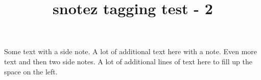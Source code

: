 \documentclass{article}
\title{snotez tagging test - 2}
\begin{document}
Some text with a side note.
A lot of additional text here with a
note. Even more text
and then two side
notes.%
A lot of additional lines of text here to
fill up the space on the left.
\end{document}
